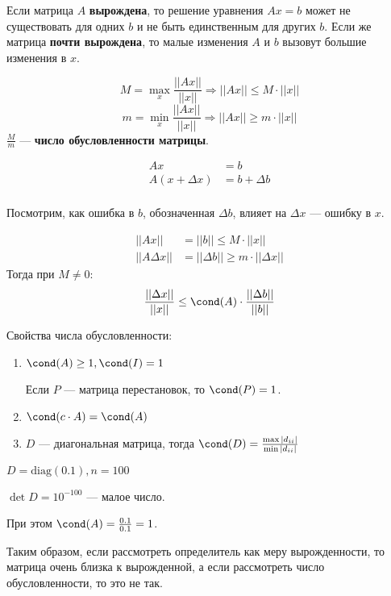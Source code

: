 Если матрица \(A\) \textbf{вырождена}, то решение уравнения \(Ax = b\) может не существовать для одних \(b\) и не быть единственным для других \(b\). Если же матрица \textbf{почти вырождена}, то малые изменения \(A\) и \(b\) вызовут большие изменения в \(x\).

\begin{definition}
    \[M = \max_x \frac{||Ax||}{||x||} \Rightarrow ||Ax|| \leq M \cdot ||x||\]
    \[m = \min_x \frac{||Ax||}{||x||} \Rightarrow ||Ax|| \geq m \cdot ||x||\]
    \(\frac{M}{m}\) --- \textbf{число обусловленности матрицы}.
\end{definition}

\begin{align}
    Ax              & = b            \\
    A(x + \Delta x) & = b + \Delta b \\
\end{align}

Посмотрим, как ошибка в \(b\), обозначенная \(\Delta b\), влияет на \(\Delta x\) --- ошибку в \(x\).

\begin{align*}
    ||Ax||          & = ||b|| \leq M \cdot ||x||                \\
    ||A \Delta x || & =  ||\Delta b|| \geq m \cdot ||\Delta x||
\end{align*}
Тогда при \(M \neq 0\):
\[\frac{||\Delta x||}{||x||} \leq \cond(A) \cdot \frac{||\Delta b||}{||b||}\]

Свойства числа обусловленности:
\begin{enumerate}
    \item \(\cond(A) \geq 1, \cond(I) = 1\)

          Если \(P\) --- матрица перестановок, то \(\cond(P) = 1\).

    \item \(\cond(c \cdot A) = \cond(A)\)
    \item \(D\) --- диагональная матрица, тогда \(\cond(D) = \frac{\max |d_{ii}|}{\min |d_{ii}|}\)
\end{enumerate}

\begin{example}
    \(D = \text{diag}(0.1), n = 100\)

    \(\det D = 10^{ - 100}\) --- малое число.

    При этом \(\cond(A) = \frac{0.1}{0.1} = 1\).

    Таким образом, если рассмотреть определитель как меру вырожденности, то матрица очень близка к вырожденной, а если рассмотреть число обусловленности, то это не так.
\end{example}
